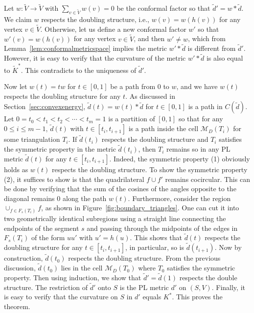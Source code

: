 \documentclass[11pt]{article}
\newenvironment{proof}[1][Proof]{\begin{trivlist}
\item[\hskip \labelsep {\bfseries #1}]}{\end{trivlist}}
\begin{document}
\begin{proof}
Let $w: \tilde{V} \rightarrow \tilde{V}$ with $\sum_{v\in \tilde{V}} w(v) = 0$ be the conformal factor 
so that $\tilde{d}' = w*\tilde{d}$. We claim $w$ respects the doubling structure, i.e., $w(v) = w(h(v))$ 
for any vertex $v\in \tilde{V}$. Otherwise, let us define a new conformal factor $w'$ so that $w'(v) = w(h(v))$ 
for any vertex $v\in \tilde{V}$, and then $w'\neq w$, which from Lemma~\ref{lem:conformalmetricspace} 
implies the metric $w'* \tilde{d}$ is different from  $\tilde{d}'$. However, it is easy to verify that the 
curvature of the metric $w'*\tilde{d}$ is also equal to $\tilde{K}^*$.
This contradicts to the uniqueness of $\tilde{d}'$. 

Now let $w(t) = tw$ for $t\in [0, 1]$ be a path from $0$ to $w$, and we have $w(t)$ respects the doubling 
structure for any $t$. As discussed in Section~\ref{sec:convexenergy}, $\tilde{d}(t) = w(t)*\tilde{d}$ for $t\in [0, 1]$
is a path in $C(\tilde{d})$. Let $0=t_0<t_1<t_2<\cdots<t_m=1$ is a partition of $[0, 1]$ so that for any $0\leq i\leq m-1$, 
$\tilde{d}(t)$ with $t\in [t_i, t_{i+1}]$ is a path inside the cell $\mathcal{M}_D(T_i)$ for some triangulation $T_i$.
If $\tilde{d}(t_i)$ respects the doubling structure and $T_i$ satisfies the symmetric property in the metric $\tilde{d}(t_i)$, 
then $T_i$ remains so in any PL metric $\tilde{d}(t)$ for any $t\in [t_i, t_{i + 1}]$. Indeed, the symmetric 
property (1) obviously holds as $w(t)$ respects the doubling structure. To show the symmetric property (2), it suffices 
to show is that the quadrilateral $f\cup f'$ remains cocircular.  This can be done by verifying that the sum of 
the cosines of the angles opposite to the diagonal remains $0$ along the path $w(t)$. 
Furthermore, consider the region $\cup_{f\in F_s(T_i)} f$, 
as shown in Figure~\ref{fig:boundary_triangles}. One can cut it into two geometrically identical subregions using a 
straight line connecting the endpoints of the segment $s$ and passing through the midpoints of the edges
in $F_s(T_i)$ of the form $uu'$ with $u' = h(u)$. This shows that $\tilde{d}(t)$ respects the doubling structure for 
any $t\in [t_i, t_{i + 1}]$, in particular, so is $\tilde{d}(t_{i+1})$. 
Now by construction, $\tilde{d}(t_0)$ respects the doubling structure.  From the previous discussion, $\tilde{d}(t_0)$
lies in the cell $\mathcal{M}_D(T_0)$ where $T_0$ satisfies the symmetric property. 
Then using induction, we show that $\tilde{d}'= \tilde{d}(1)$ respects the double structure. 
The restriction of $\tilde{d}'$ onto $S$ is the PL metric $d'$ on $(S, V)$. Finally, it is easy to verify 
that the curvature on $S$ in $d'$ equals $K^*$. This proves the theorem.  
\end{proof}
\end{document}
